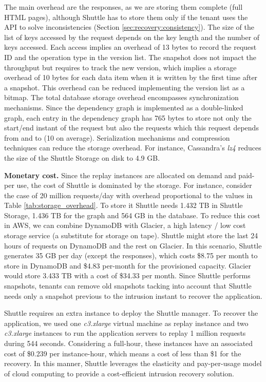 The main overhead are the responses, as we are storing them complete (full HTML pages), although  Shuttle has to store them only if the tenant uses the API to solve inconsistencies (Section \ref{sec:recovery:consistency}). The size of the list of keys accessed by the request depends on the key length and the number of keys accessed. Each access implies an overhead of 13 bytes to record the request ID and the operation type in the version list. The snapshot does not impact the throughput but requires to track the new version, which implies a storage overhead of 10 bytes for each data item when it is written by the first time after a snapshot. This overhead can be reduced implementing the version list as a bitmap. The total database storage overhead encompasses synchronization mechanisms. Since the dependency graph is implemented as a double-linked graph, each entry in the dependency graph has 765 bytes to store not only the start/end instant of the request but also the requests which this request depends from and to (10 on average). Serialization mechanisms and compression techniques can reduce the storage overhead. For instance, Cassandra's \emph{lz4} reduces the size of the Shuttle Storage on disk to 4.9 GB.


\textbf{Monetary cost.}
%
Since the replay instances are allocated on demand and paid-per use, the cost of Shuttle is dominated by the storage. 
For instance, consider the case of 20 million requests/day with overhead proportional to the values in Table \ref{tab:storage_overhead}. To store it Shuttle needs 1.432 TB in Shuttle Storage, 1.436 TB for the graph and 564 GB in the database. 
To reduce this cost in AWS, we can combine DynamoDB with Glacier, a high latency / low cost storage service (a substitute for storage on tape). Shuttle might store the last 24 hours of requests on DynamoDB and the rest on Glacier. In this scenario, Shuttle generates 35 GB per day (except the responses), which costs \$8.75 per month to store in DynamoDB and \$4.83 per-month for the provisioned capacity. Glacier would store 3.433 TB with a cost of \$34.33 per month. Since Shuttle performs snapshots, tenants can remove old snapshots tacking into account that Shuttle needs only a snapshot previous to the intrusion instant to recover the application.

Shuttle requires an extra instance to deploy the Shuttle manager. To recover the application, we used one \emph{c3.xlarge} virtual machine as replay instance and two  \emph{c3.xlarge} instances to run the application servers to replay 1 million requests during 544 seconds. Considering a full-hour, these instances have an associated cost of \$0.239 per instance-hour, which means a cost of less than \$1 for the recovery. In this manner, Shuttle leverages the elasticity and pay-per-usage model of cloud computing to provide a cost-efficient intrusion recovery solution.
